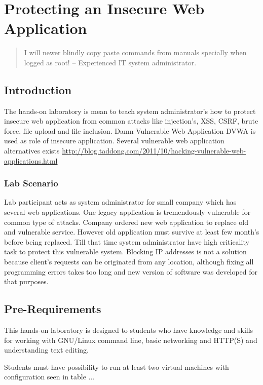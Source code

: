 \chapter{Protecting an Insecure Web Application}
\label{Protecting an Insecure Web Application}

\begin{quote}
I will newer blindly copy paste commands from manuals specially when logged as root! -- Experienced IT system administrator.
\end{quote}

\section{Introduction}

The hands-on laboratory is mean to teach system administrator's how to protect insecure web application from common attacks like injection's, \gls{XSS}, \gls{CSRF}, brute force, file upload and file inclusion. Damn Vulnerable Web Application \gls{DVWA} is used as role of insecure application. Several vulnerable web application  alternatives exists \url{http://blog.taddong.com/2011/10/hacking-vulnerable-web-applications.html}


\subsection{Lab Scenario}
Lab participant acts as system administrator for small company which has several web applications. One legacy application is tremendously vulnerable for common type of attacks. Company ordered new web application to replace old and vulnerable service. However old application must survive at least few month's before being replaced. Till that time system administrator have high criticality task  to protect this vulnerable system. Blocking IP addresses is not a solution because client's requests can be originated from any location, although fixing all programming errors takes too long and new version of software was developed for that purposes.



\section{Pre-Requirements}
This hands-on laboratory is designed to students who have knowledge and skills for working with GNU/Linux command line, basic networking and HTTP(S) and understanding text editing.
\par
Students must have possibility to run at least two virtual machines with configuration seen in table ...

